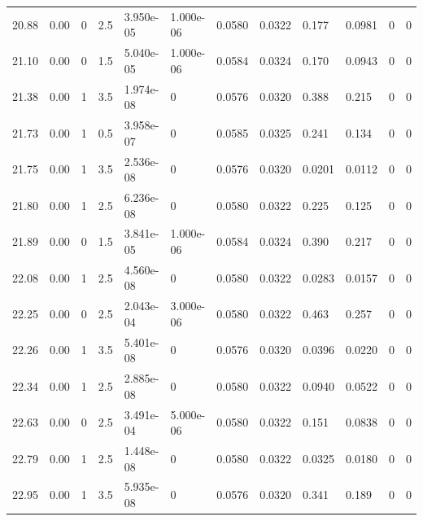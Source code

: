 \documentclass[preview]{standalone}
\begin{document}
{{{{\begin{tabular}{L{1.2cm}C{1.2cm} C{0.3cm}C{0.5cm} C{1.4cm}C{1.4cm} C{1.4cm}C{1.4cm} C{1.6cm}C{1.6cm} C{1.6cm}C{1.6cm}}
  20.88  &  0.00  & 0     & 2.5 &  3.950e-05  & 1.000e-06  &  0.0580&   0.0322& 0.177 & 0.0981   &  0 & 0  \\ 
  21.10  &  0.00  & 0     & 1.5 &  5.040e-05  & 1.000e-06  &  0.0584&   0.0324& 0.170 & 0.0943   &  0 & 0  \\ 
  21.38  &  0.00  & 1     & 3.5 &  1.974e-08  & 0  &  0.0576&   0.0320& 0.388 & 0.215   &  0 & 0  \\ 
  21.73  &  0.00  & 1     & 0.5 &  3.958e-07  & 0  &  0.0585&   0.0325& 0.241 & 0.134   &  0 & 0  \\ 
  21.75  &  0.00  & 1     & 3.5 &  2.536e-08  & 0  &  0.0576&   0.0320& 0.0201 & 0.0112   &  0 & 0  \\ 
  21.80  &  0.00  & 1     & 2.5 &  6.236e-08  & 0  &  0.0580&   0.0322& 0.225 & 0.125   &  0 & 0  \\ 
  21.89  &  0.00  & 0     & 1.5 &  3.841e-05  & 1.000e-06  &  0.0584&   0.0324& 0.390 & 0.217   &  0 & 0  \\ 
  22.08  &  0.00  & 1     & 2.5 &  4.560e-08  & 0  &  0.0580&   0.0322& 0.0283 & 0.0157   &  0 & 0  \\ 
  22.25  &  0.00  & 0     & 2.5 &  2.043e-04  & 3.000e-06  &  0.0580&   0.0322& 0.463 & 0.257   &  0 & 0  \\ 
  22.26  &  0.00  & 1     & 3.5 &  5.401e-08  & 0  &  0.0576&   0.0320& 0.0396 & 0.0220   &  0 & 0  \\ 
  22.34  &  0.00  & 1     & 2.5 &  2.885e-08  & 0  &  0.0580&   0.0322& 0.0940 & 0.0522   &  0 & 0  \\ 
  22.63  &  0.00  & 0     & 2.5 &  3.491e-04  & 5.000e-06  &  0.0580&   0.0322& 0.151 & 0.0838   &  0 & 0  \\ 
  22.79  &  0.00  & 1     & 2.5 &  1.448e-08  & 0  &  0.0580&   0.0322& 0.0325 & 0.0180   &  0 & 0  \\ 
  22.95  &  0.00  & 1     & 3.5 &  5.935e-08  & 0  &  0.0576&   0.0320& 0.341 & 0.189   &  0 & 0  \\ 
\hline 
\end{tabular} 

}}}}
\end{document}
